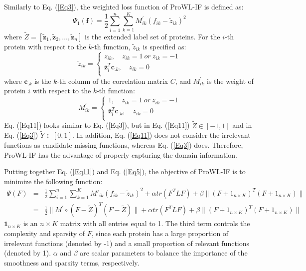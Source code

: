 \documentclass{llncs} %
\begin{document}
 Similarly to Eq. (\ref{Eq3}), the weighted loss function of ProWL-IF is defined as:
\begin{equation}
  \Psi_1(\mathbf{f})=\frac{1}{2} \sum_{i=1}^n \sum_{k=1}^{K}  M^{'}_{ik}(f_{ik}-\tilde{z}_{ik})^2
  \label{Eq11}
\end{equation}
where $\tilde{Z}=[\tilde{\mathbf{z}}_1,\tilde{\mathbf{z}}_2, \ldots, \tilde{\mathbf{z}}_n]$ is the extended label set of proteins. For the $i$-th protein with respect to the $k$-th function, $\tilde{z}_{ik}$ is specified as:
\begin{equation}
\tilde{z}_{ik}=
\left\{
\begin{array}{l}
z_{ik}, \quad z_{ik}=1 \ or \ z_{ik}=-1\\
\bar{\mathbf{z}}_{i}^{T} \mathbf{c}_{.k},\quad z_{ik}=0\\
\end{array}
\right.
\label{Eq12}
\end{equation}
where $\mathbf{c}_{.k}$ is the $k$-th column of the correlation matrix $C$, and $M^{'}_{ik}$ is the weight of protein $i$ with respect to the $k$-th function:
\begin{equation}
M^{'}_{ik}=
\left\{
\begin{array}{l}
1, \quad z_{ik}=1 \ or \ z_{ik}=-1\\
\bar{\mathbf{z}}_{i}^{T} \mathbf{c}_{.k},\quad z_{ik}=0\\
\end{array}
\right.
\label{Eq13}
\end{equation}
Eq. (\ref{Eq11}) looks similar to Eq. (\ref{Eq3}), but  in Eq. (\ref{Eq11}) $\tilde{Z} \in [-1,1]$ and in Eq. (\ref{Eq3}) $\tilde{Y} \in [0,1]$. In addition, Eq. (\ref{Eq11}) does not consider the irrelevant functions as candidate missing functions, whereas Eq. (\ref{Eq3}) does. Therefore, ProWL-IF has the advantage of properly capturing the domain information.

Putting together Eq. (\ref{Eq11}) and Eq. (\ref{Eq5}), the objective of ProWL-IF is to minimize the following function:
{\scriptsize
\begin{eqnarray}
\Psi(F)&=&\frac{1}{2} \sum_{i=1}^n \sum_{k=1}^{K}  M{'}_{ik}(f_{ik}-\tilde{z}_{ik})^2 +\alpha tr(F^{T}LF)+ \beta \|(F+1_{n\times K})^{T}(F+1_{n\times K})\|\nonumber\\
         &=&\frac{1}{2} \|M^{'}\circ(F-\tilde{Z})^{T}(F-\tilde{Z})\|+\alpha tr(F^{T}LF)+ \beta \|(F+1_{n\times K})^{T}(F+1_{n\times K})\|
  \label{Eq14}
\end{eqnarray}
}
$\mathbf{1}_{n\times K}$ is an $n \times K$ matrix with all entries equal to 1. The third term controls the complexity and sparsity of $F$, since each protein has a large proportion of irrelevant functions (denoted by -1) and a small proportion of relevant functions (denoted by 1). $\alpha$ and $\beta$ are scalar parameters to balance the importance of the smoothness and sparsity terms, respectively.
\end{document}
